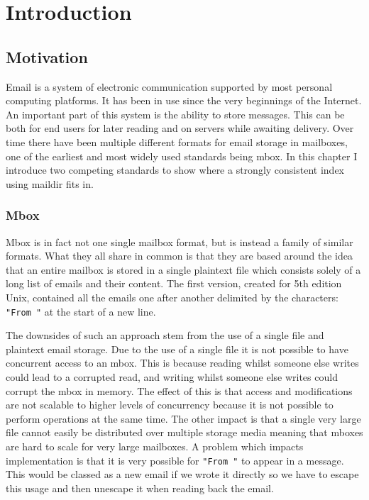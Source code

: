 \chapter{Introduction}

\section{Motivation}

Email is a system of electronic communication supported by most personal computing platforms. It has been in use since the very beginnings of the Internet. An important part of this system is the ability to store messages. This can be both for end users for later reading and on servers while awaiting delivery. Over time there have been multiple different formats for email storage in mailboxes, one of the earliest and most widely used standards being mbox. In this chapter I introduce two competing standards to show where a strongly consistent index using maildir fits in.

\subsection{Mbox}

Mbox is in fact not one single mailbox format, but is instead a family of similar formats. What they all share in common is that they are based around the idea that an entire mailbox is stored in a single plaintext file which consists solely of a long list of emails and their content. The first version, created for 5th edition Unix, contained all the emails one after another delimited by the characters: \texttt{"From "} at the start of a new line.

The downsides of such an approach stem from the use of a single file and plaintext email storage. Due to the use of a single file it is not possible to have concurrent access to an mbox. This is because reading whilst someone else writes could lead to a corrupted read, and writing whilst someone else writes could corrupt the mbox in memory. The effect of this is that access and modifications are not scalable to higher levels of concurrency because it is not possible to perform operations at the same time. The other impact is that a single very large file cannot easily be distributed over multiple storage media meaning that mboxes are hard to scale for very large mailboxes. A problem which impacts implementation is that it is very possible for \texttt{"From "} to appear in a message. This would be classed as a new email if we wrote it directly so we have to escape this usage and then unescape it when reading back the email.

